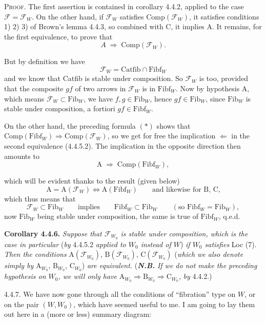 \documentclass[11pt]{article}
\newcommand{\printedpage}[1]{\marginpar{\footnotesize p.~#1}}
\newcommand{\msp}[1]{\marginpar{\footnotesize [#1]}}
\newcommand{\cF}{\mathcal{F}}
\newcommand{\Fib}{\mathrm{Fib}}
\newcommand{\Fibf}{\mathrm{Fibf}}
\newcommand{\Comp}{\mathrm{Comp}}
\newcommand{\Catfib}{\mathrm{Catfib}}
\begin{document}
\printedpage{27}

\textsc{Proof}. The first assertion is contained in corollary 4.4.2, applied to the case $\cF = \cF_W$. On the other hand, if $\cF_W$ satisfies $\Comp(\cF_W)$, it satisfies conditions 1) 2) 3) of Brown's lemma 4.4.3, so combined with C, it implies A. It remains, for the first equivalence, to prove that
\[
A \;\Longrightarrow\; \Comp(\cF_W).
\]

\msp{page 46}

But by definition we have
\[
\cF_W = \Catfib \cap \Fibf_W
\tag*{$(*)$}
\]
and we know that Catfib is stable under composition. So $\cF_W$ is too, provided that the composite $gf$ of two arrows in $\cF_W$ is in $\Fibf_W$. Now by hypothesis A, which means $\cF_W \subset \Fib_W$, we have $f, g \in \Fib_W$, hence $gf \in \Fib_W$, since $\Fib_W$ is stable under composition, a fortiori $gf \in \Fibf_W$.

On the other hand, the preceding formula $(*)$ shows that $\Comp(\Fibf_W) \Longrightarrow \Comp(\cF_W)$, so we get for free the implication $\Longleftarrow$ in the second equivalence (4.4.5.2). The implication in the opposite direction then amounts to
\[
\mathrm{A} \;\Longrightarrow\; \Comp(\Fibf_W),
\]

\msp{page 47}

which will be evident thanks to the result (given below)
\[
\mathrm{A} = \mathrm{A}(\cF_W) \iff \mathrm{A}(\Fibf_W) \qquad \text{and likewise for B, C,}
\]
which thus means that
\[
\cF_W \subset \Fib_W \qquad \text{implies} \qquad \Fibf_W \subset \Fib_W \qquad (\text{so } \Fibf_W = \Fib_W),
\]
now $\Fib_W$ being stable under composition, the same is true of $\Fibf_W$, q.e.d.

\textbf{Corollary 4.4.6.} \textit{Suppose that $\cF_{W_0}$ is stable under composition, which is the case in particular} (\textit{by} 4.4.5.2 \textit{applied to $W_0$ instead of $W$}) \textit{if $W_0$ satisfies} Loc (7). \textit{Then the conditions} $\mathrm{A}(\cF_{W_0})$, $\mathrm{B}(\cF_{W_0})$, $\mathrm{C}(\cF_{W_0})$ (\textit{which we also denote simply by} $\mathrm{A}_{W_0}$, $\mathrm{B}_{W_0}$, $\mathrm{C}_{W_0}$) \textit{are equivalent.} (\textbf{\textit{N.B.}} \textit{If we do not make the preceding hypothesis on $W_0$, we will only have} $\mathrm{A}_{W_0} \Longrightarrow \mathrm{B}_{W_0} \Longrightarrow \mathrm{C}_{W_0}$, \textit{by} 4.4.2.)

4.4.7. We have now gone through all the conditions of ``fibration'' type on $W$, or on the pair $(W, W_0)$, which have seemed useful to me. I am going to lay them out here in a (more or less) summary diagram: %
\end{document}
